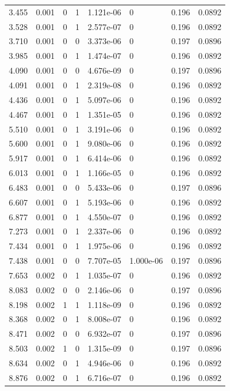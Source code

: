 \documentclass[preview]{standalone}
\begin{document}
{{\begin{tabular}{L{1.2cm}C{1.2cm} C{0.3cm}C{0.5cm} C{1.4cm}C{1.4cm} C{1.4cm}C{1.4cm}}
  3.455  &  0.001  & 0     &  1 &  1.121e-06  & 0  & 0.196 &  0.0892   \\ 
  3.528  &  0.001  & 0     &  1 &  2.577e-07  & 0  & 0.196 &  0.0892   \\ 
  3.710  &  0.001  & 0     &  0 &  3.373e-06  & 0  & 0.197 &  0.0896   \\ 
  3.985  &  0.001  & 0     &  1 &  1.474e-07  & 0  & 0.196 &  0.0892   \\ 
  4.090  &  0.001  & 0     &  0 &  4.676e-09  & 0  & 0.197 &  0.0896   \\ 
  4.091  &  0.001  & 0     &  1 &  2.319e-08  & 0  & 0.196 &  0.0892   \\ 
  4.436  &  0.001  & 0     &  1 &  5.097e-06  & 0  & 0.196 &  0.0892   \\ 
  4.467  &  0.001  & 0     &  1 &  1.351e-05  & 0  & 0.196 &  0.0892   \\ 
  5.510  &  0.001  & 0     &  1 &  3.191e-06  & 0  & 0.196 &  0.0892   \\ 
  5.600  &  0.001  & 0     &  1 &  9.080e-06  & 0  & 0.196 &  0.0892   \\ 
  5.917  &  0.001  & 0     &  1 &  6.414e-06  & 0  & 0.196 &  0.0892   \\ 
  6.013  &  0.001  & 0     &  1 &  1.166e-05  & 0  & 0.196 &  0.0892   \\ 
  6.483  &  0.001  & 0     &  0 &  5.433e-06  & 0  & 0.197 &  0.0896   \\ 
  6.607  &  0.001  & 0     &  1 &  5.193e-06  & 0  & 0.196 &  0.0892   \\ 
  6.877  &  0.001  & 0     &  1 &  4.550e-07  & 0  & 0.196 &  0.0892   \\ 
  7.273  &  0.001  & 0     &  1 &  2.337e-06  & 0  & 0.196 &  0.0892   \\ 
  7.434  &  0.001  & 0     &  1 &  1.975e-06  & 0  & 0.196 &  0.0892   \\ 
  7.438  &  0.001  & 0     &  0 &  7.707e-05  & 1.000e-06  & 0.197 &  0.0896   \\ 
  7.653  &  0.002  & 0     &  1 &  1.035e-07  & 0  & 0.196 &  0.0892   \\ 
  8.083  &  0.002  & 0     &  0 &  2.146e-06  & 0  & 0.197 &  0.0896   \\ 
  8.198  &  0.002  & 1     &  1 &  1.118e-09  & 0  & 0.196 &  0.0892   \\ 
  8.368  &  0.002  & 0     &  1 &  8.008e-07  & 0  & 0.196 &  0.0892   \\ 
  8.471  &  0.002  & 0     &  0 &  6.932e-07  & 0  & 0.197 &  0.0896   \\ 
  8.503  &  0.002  & 1     &  0 &  1.315e-09  & 0  & 0.197 &  0.0896   \\ 
  8.634  &  0.002  & 0     &  1 &  4.946e-06  & 0  & 0.196 &  0.0892   \\ 
  8.876  &  0.002  & 0     &  1 &  6.716e-07  & 0  & 0.196 &  0.0892   \\ 
\hline 
\end{tabular} 

}}
\end{document}
